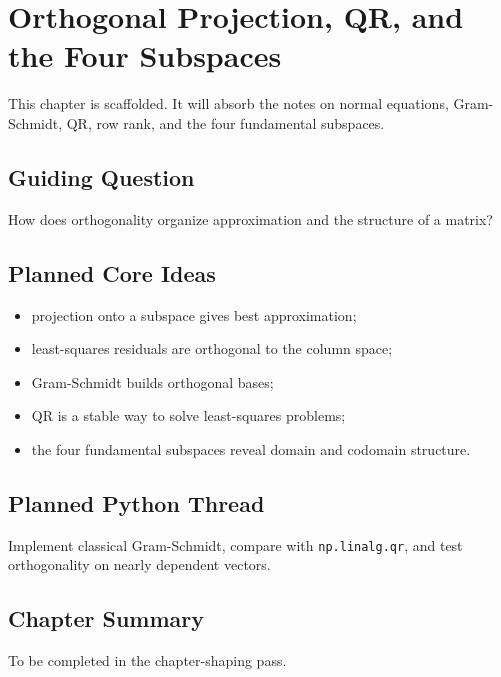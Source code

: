 \chapter{Orthogonal Projection, QR, and the Four Subspaces}
\label{ch:projection-qr-four-subspaces}

\begin{draftbox}
This chapter is scaffolded. It will absorb the notes on normal equations,
Gram-Schmidt, QR, row rank, and the four fundamental subspaces.
\end{draftbox}

\section{Guiding Question}

How does orthogonality organize approximation and the structure of a matrix?

\section{Planned Core Ideas}

\begin{itemize}
  \item projection onto a subspace gives best approximation;
  \item least-squares residuals are orthogonal to the column space;
  \item Gram-Schmidt builds orthogonal bases;
  \item QR is a stable way to solve least-squares problems;
  \item the four fundamental subspaces reveal domain and codomain structure.
\end{itemize}

\section{Planned Python Thread}

Implement classical Gram-Schmidt, compare with \texttt{np.linalg.qr}, and test
orthogonality on nearly dependent vectors.

\section*{Chapter Summary}

To be completed in the chapter-shaping pass.


